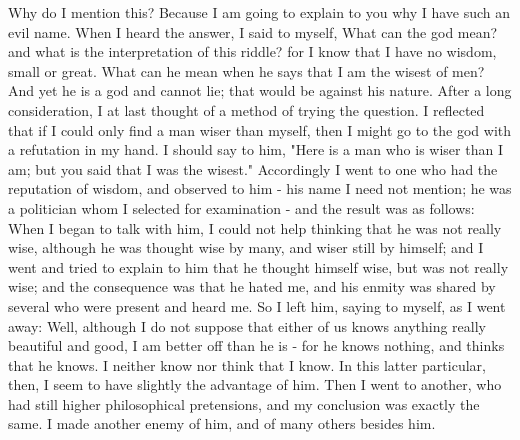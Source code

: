\documentclass[11pt]{article}
\begin{document}
Why do I mention this? Because I am going to explain to you why I have such an evil name. When I heard the answer, I said to myself, What can the god mean? and what is the interpretation of this riddle? for I know that I have no wisdom, small or great. What can he mean when he says that I am the wisest of men? And yet he is a god and cannot lie; that would be against his nature. After a long consideration, I at last thought of a method of trying the question. I reflected that if I could only find a man wiser than myself, then I might go to the god with a refutation in my hand. I should say to him, "Here is a man who is wiser than I am; but you said that I was the wisest." Accordingly I went to one who had the reputation of wisdom, and observed to him - his name I need not mention; he was a politician whom I selected for examination - and the result was as follows: When I began to talk with him, I could not help thinking that he was not really wise, although he was thought wise by many, and wiser still by himself; and I went and tried to explain to him that he thought himself wise, but was not really wise; and the consequence was that he hated me, and his enmity was shared by several who were present and heard me. So I left him, saying to myself, as I went away: Well, although I do not suppose that either of us knows anything really beautiful and good, I am better off than he is - for he knows nothing, and thinks that he knows. I neither know nor think that I know. In this latter particular, then, I seem to have slightly the advantage of him. Then I went to another, who had still higher philosophical pretensions, and my conclusion was exactly the same. I made another enemy of him, and of many others besides him.
\end{document}
